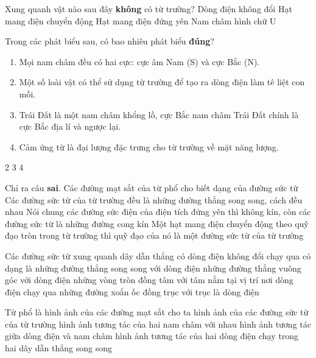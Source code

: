 \begin{ex}
	Xung quanh vật nào sau đây \textbf{không} có từ trường?	
	\choice
	{Dòng điện không đổi}
	{Hạt mang điện chuyển động}
	{\True Hạt mang điện đứng yên}
	{Nam châm hình chữ U}
	\loigiai{}
\end{ex}
\begin{ex}
	Trong các phát biểu sau, có bao nhiêu phát biểu \textbf{đúng}?	
	\begin{enumerate}[label=(\arabic*)]
		\item Mọi nam châm đều có hai cực: cực âm Nam (S) và cực Bắc  (N).
		\item Một số loài vật có thể sử dụng từ trường để tạo ra dòng điện làm tê liệt con mồi.
		\item Trái Đất là một nam châm khổng lồ, cực Bắc nam châm Trái Đất chính là cực Bắc địa lí và ngược lại.
		\item Cảm ứng từ là đại lượng đặc trưng cho từ trường về mặt năng lượng.
	\end{enumerate}
	\choice
	{}
	{2}
	{3}
	{4}
\end{ex}
\begin{ex}
	Chỉ ra câu \textbf{sai}.	
	\choice
	{Các đường mạt sắt của từ phổ cho biết dạng của đường sức từ}
	{Các đường sức từ của từ trường đều là những đường thẳng song song, cách đều nhau}
	{Nói chung các đường sức điện của điện tích đứng yên thì không kín, còn các đường sức từ là những đường cong kín}
	{\True Một hạt mang điện chuyển động theo quỹ đạo tròn trong từ trường thì quỹ đạo của nó là một đường sức từ của từ trường}
	\loigiai{}
\end{ex}
\begin{ex}
	Các đường sức từ xung quanh dây dẫn thẳng có dòng điện không đổi chạy qua có dạng là	
	\choice
	{những đường thẳng song song với dòng điện}
	{những đường thẳng vuông góc với dòng điện}
	{\True những vòng tròn đồng tâm với tâm nằm tại vị trí nơi dòng điện chạy qua}
	{những đường xoắn ốc đồng trục với trục là dòng điện}
	\loigiai{}
\end{ex}
\begin{ex}
	Từ phổ là
	\choice
	{\True hình ảnh của các đường mạt sắt cho ta hình ảnh của các đường sức từ của từ trường}
	{hình ảnh tương tác của hai nam châm với nhau}
	{hình ảnh tương tác giữa dòng điện và nam châm}
	{hình ảnh tương tác của hai dòng điện chạy trong hai dây dẫn thẳng song song}
	\loigiai{}
\end{ex}
